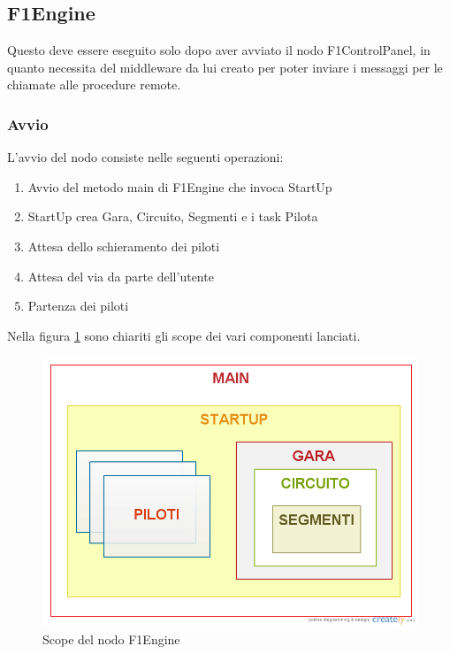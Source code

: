 \documentclass[a4paper,11pt, twoside, openright]{book}
\begin{document}
      \subsection{F1Engine}
        Questo deve essere eseguito solo dopo aver avviato il nodo F1ControlPanel, in quanto necessita
	del middleware da lui creato per poter inviare i messaggi per le chiamate alle procedure remote.
	
	\subsubsection{Avvio}
	  L'avvio del nodo consiste nelle seguenti operazioni:
	  
	  \begin{enumerate}
	    \item Avvio del metodo main di F1Engine che invoca StartUp
	    \item StartUp crea Gara, Circuito, Segmenti e i task Pilota
	    \item Attesa dello schieramento dei piloti
	    \item Attesa del via da parte dell'utente
	    \item Partenza dei piloti
	  \end{enumerate}
	  
	  Nella figura \ref{Fig:Scope} sono chiariti gli scope dei vari componenti lanciati.
	  
	  \begin{figure}[ht]
	    \centering
	    \includegraphics[width=120mm]{./Immagini/Scope.png}
	    \caption{Scope del nodo F1Engine}
	    \label{Fig:Scope}
	  \end{figure}
  
\end{document}
